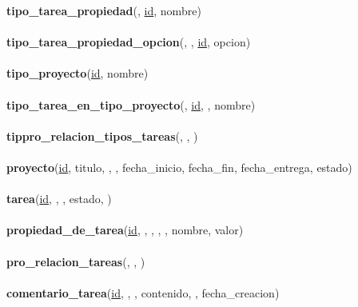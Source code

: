 \documentclass[a4paper, 12pt,twoside]{report}  %
\numberwithin{equation}{subsection} %
\begin{document}
\textbf{tipo\_tarea\_propiedad}(\underline{}, \underline{id}, nombre)
\\\\
\textbf{tipo\_tarea\_propiedad\_opcion}(\underline{}, \underline{}, \underline{id}, opcion)
\\\\
\textbf{tipo\_proyecto}(\underline{id}, nombre)
\\\\
\textbf{tipo\_tarea\_en\_tipo\_proyecto}(\underline{}, \underline{id}, , nombre)
\\\\
\textbf{tippro\_relacion\_tipos\_tareas}(\underline{}, \underline{}, \underline{})
\\\\
\textbf{proyecto}(\underline{id}, titulo, , , fecha\_inicio, fecha\_fin, fecha\_entrega, estado)
\\\\
\textbf{tarea}(\underline{id}, \underline{}, , estado, )
\\\\
\textbf{propiedad\_de\_tarea}(\underline{id}, \underline{}, \underline{}, , , nombre, valor)
\\\\
\textbf{pro\_relacion\_tareas}(\underline{}, \underline{}, \underline{})
\\\\
\textbf{comentario\_tarea}(\underline{id}, \underline{}, \underline{}, contenido, , fecha\_creacion)
\end{document}
